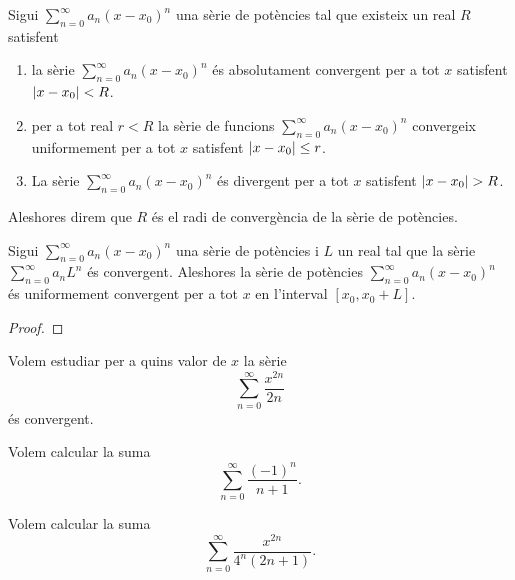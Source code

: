 \documentclass[../../Main.tex]{subfiles}
\begin{document}
	\begin{definition}
		Sigui \(\sum_{n=0}^{\infty}a_{n}(x-x_{0})^{n}\) una sèrie de potències tal que existeix un real \(R\) satisfent
		\begin{enumerate}
			\item la sèrie \(\sum_{n=0}^{\infty}a_{n}(x-x_{0})^{n}\) és absolutament convergent per a tot \(x\) satisfent \(\abs{x-x_{0}}<R\).
			\item per a tot real \(r<R\) la sèrie de funcions \(\sum_{n=0}^{\infty}a_{n}(x-x_{0})^{n}\) convergeix uniformement per a tot \(x\) satisfent \(\abs{x-x_{0}}\leq r\).
			\item La sèrie \(\sum_{n=0}^{\infty}a_{n}(x-x_{0})^{n}\) és divergent per a tot \(x\) satisfent \(\abs{x-x_{0}}>R\).
		\end{enumerate}
		Aleshores direm que \(R\) és el radi de convergència de la sèrie de potències.
	\end{definition}
	\begin{theorem}
		\label{thm:Teorema d'Abel}
		Sigui \(\sum_{n=0}^{\infty}a_{n}(x-x_{0})^{n}\) una sèrie de potències i \(L\) un real tal que la sèrie \(\sum_{n=0}^{\infty}a_{n}L^{n}\) és convergent. Aleshores la sèrie de potències \(\sum_{n=0}^{\infty}a_{n}(x-x_{0})^{n}\) és uniformement convergent per a tot \(x\) en l'interval \([x_{0},x_{0}+L]\).
		\begin{proof}
		\end{proof}
	\end{theorem}
	\begin{example}
		\label{ex:radi de convergència d'una sèrie de potències}
		Volem estudiar per a quins valor de \(x\) la sèrie
		\[\sum_{n=0}^{\infty}\frac{x^{2n}}{2n}\]
		és convergent.
		\begin{solution}
		\end{solution}
	\end{example}
	\begin{example}
		\label{ex:calcular una suma trobant un Taylor equivalent}
		Volem calcular la suma
		\[\sum_{n=0}^{\infty}\frac{(-1)^{n}}{n+1}.\] %
		\begin{solution}
		\end{solution}
	\end{example}
	\begin{example}
		\label{ex:calcular el radi de convergència i suma d'una sèrie de potències}
		Volem calcular la suma
		\[\sum_{n=0}^{\infty}\frac{x^{2n}}{4^{n}(2n+1)}.\] %
		\begin{solution}
		\end{solution}
	\end{example}
\end{document}
